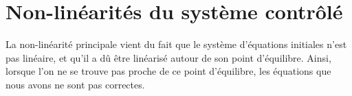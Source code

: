 \documentclass[frenchb, paper=a4, fontsize=11pt]{scrartcl}
\numberwithin{equation}{section}					%
\numberwithin{figure}{section}					%
\numberwithin{table}{section}						%
\begin{document}
\section{Non-linéarités du système contrôlé}
La non-linéarité principale vient du fait que le système d'équations initiales n'est pas linéaire, et qu'il a dû être linéarisé autour de son point d'équilibre. Ainsi, lorsque l'on ne se trouve pas proche de ce point d'équilibre, les équations que nous avons ne sont pas correctes.
\end{document}
